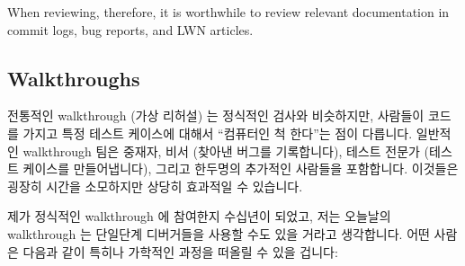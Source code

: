 When reviewing, therefore, it is worthwhile to review relevant documentation
in commit logs, bug reports, and LWN articles.
\fi

\subsection{Walkthroughs}
\label{sec:debugging:Walkthroughs}

전통적인 walkthrough (가상 리허설) 는 정식적인 검사와 비슷하지만, 사람들이
코드를 가지고 특정 테스트 케이스에 대해서 ``컴퓨터인 척 한다''는 점이 다릅니다.
일반적인 walkthrough 팀은 중재자, 비서 (찾아낸 버그를 기록합니다), 테스트
전문가 (테스트 케이스를 만들어냅니다), 그리고 한두명의 추가적인 사람들을
포함합니다.
이것들은 굉장히 시간을 소모하지만 상당히 효과적일 수 있습니다.

제가 정식적인 walkthrough 에 참여한지 수십년이 되었고, 저는 오늘날의
walkthrough 는 단일단계 디버거들을 사용할 수도 있을 거라고 생각합니다.
어떤 사람은 다음과 같이 특히나 가학적인 과정을 떠올릴 수 있을 겁니다:

